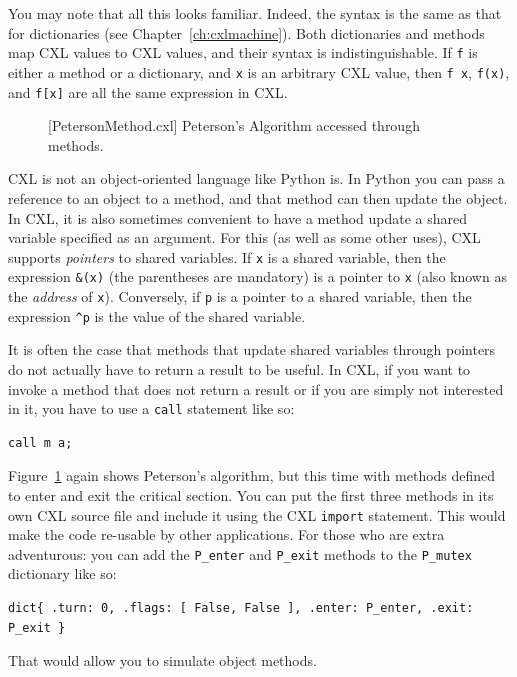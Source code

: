 \documentclass{report}
\newenvironment{code}{
\tcolorbox
}{
\endtcolorbox
}
\begin{document}
You may note that all this looks familiar.  Indeed, the syntax
is the same as that for dictionaries (see Chapter~\ref{ch:cxlmachine}).
Both dictionaries and methods map CXL values to CXL values,
and their syntax is indistinguishable.
If \texttt{f} is either a method or a
dictionary, and \texttt{x} is an arbitrary CXL value, then
\texttt{f x}, \texttt{f(x)}, and \texttt{f[x]} are all
the same expression in CXL.

\begin{figure}
\begin{code}
\end{code}
\caption{[PetersonMethod.cxl] Peterson's Algorithm accessed through methods.}
\label{fig:petersonmethods}
\end{figure}

CXL is not an object-oriented language like Python is.  In Python
you can pass a reference to an object to a method, and that method
can then update the object.  In CXL, it is also sometimes convenient
to have a method update a shared variable specified as an argument.
For this (as well as some other uses), CXL supports \emph{pointers}
to shared variables.
If \texttt{x} is a shared variable, then the expression \texttt{\&(x)}
(the parentheses are mandatory) is a pointer to \texttt{x}
(also known as the \emph{address}
of \texttt{x}).
Conversely, if \texttt{p} is a pointer to a shared variable, then the
expression \texttt{\^{}p} is the value of the shared variable.

It is often the case that methods that update shared variables through
pointers do not actually have to return a result to be useful.
In CXL, if you want to invoke a method that does not return a result
or if you are simply not interested in it,
you have to use a \texttt{call} statement like so:
\begin{code}
\begin{verbatim}
call m a;
\end{verbatim}
\end{code}

Figure~\ref{fig:petersonmethods} again shows Peterson's algorithm,
but this time with methods defined to enter and exit the critical
section.
You can put the first three methods in its own CXL source file
and include it using the CXL \texttt{import} statement.
This would
make the code re-usable by other applications.  For those who are
extra adventurous: you can add the \texttt{P\_enter} and
\texttt{P\_exit} methods to the \texttt{P\_mutex} dictionary
like so:
\begin{code}
\begin{verbatim}
dict{ .turn: 0, .flags: [ False, False ], .enter: P_enter, .exit: P_exit }
\end{verbatim}
\end{code}
That would allow you to simulate object methods.
\end{document}
